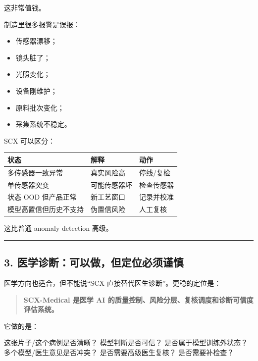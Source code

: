 \documentclass[
  12pt,
]{ctexart}
\newenvironment{Shaded}{}{}
\newcommand{\NormalTok}[1]{#1}
\providecommand{\tightlist}{%
  \setlength{\itemsep}{0pt}\setlength{\parskip}{0pt}}
\begin{document}
这非常值钱。

制造里很多报警是误报：

\begin{itemize}
\tightlist
\item
  传感器漂移；
\item
  镜头脏了；
\item
  光照变化；
\item
  设备刚维护；
\item
  原料批次变化；
\item
  采集系统不稳定。
\end{itemize}

SCX 可以区分：

\begin{longtable}[]{@{}lll@{}}
\toprule\noalign{}
状态 & 解释 & 动作 \\
\midrule\noalign{}
\endhead
\bottomrule\noalign{}
\endlastfoot
多传感器一致异常 & 真实风险高 & 停线/复检 \\
单传感器突变 & 可能传感器坏 & 检查传感器 \\
状态 OOD 但产品正常 & 新工艺窗口 & 记录并校准 \\
模型高置信但历史不支持 & 伪置信风险 & 人工复核 \\
\end{longtable}

这比普通 anomaly detection 高级。

\begin{center}\rule{0.5\linewidth}{0.5pt}\end{center}

\subsection{3.
医学诊断：可以做，但定位必须谨慎}\label{ux533bux5b66ux8bcaux65adux53efux4ee5ux505aux4f46ux5b9aux4f4dux5fc5ux987bux8c28ux614e}

医学方向也适合，但不能说``SCX 直接替代医生诊断''。更稳的定位是：

\begin{quote}
\textbf{SCX-Medical 是医学 AI
的质量控制、风险分层、复核调度和诊断可信度评估系统。}
\end{quote}

它做的是：

\begin{Shaded}
\begin{Highlighting}[]
\NormalTok{这张片子/这个病例是否清晰？}
\NormalTok{模型判断是否可信？}
\NormalTok{是否属于模型训练外状态？}
\NormalTok{多个模型/医生意见是否冲突？}
\NormalTok{是否需要高级医生复核？}
\NormalTok{是否需要补检查？}
\end{Highlighting}
\end{Shaded}
\end{document}
